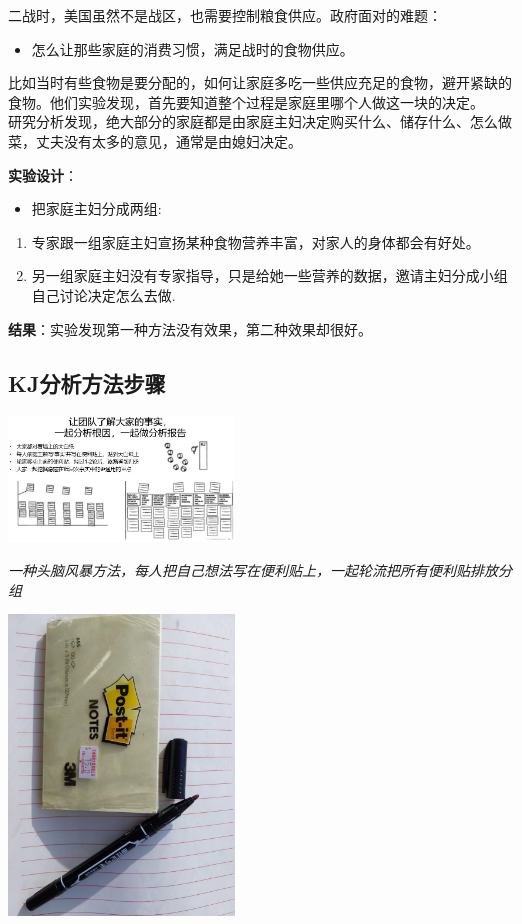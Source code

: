 二战时，美国虽然不是战区，也需要控制粮食供应。政府面对的难题：

\begin{itemize}
\tightlist
\item
  怎么让那些家庭的消费习惯，满足战时的食物供应。
\end{itemize}

比如当时有些食物是要分配的，如何让家庭多吃一些供应充足的食物，避开紧缺的食物。他们实验发现，首先要知道整个过程是家庭里哪个人做这一块的决定。\\
研究分析发现，绝大部分的家庭都是由家庭主妇决定购买什么、储存什么、怎么做菜，丈夫没有太多的意见，通常是由媳妇决定。

\textbf{实验设计}：

\begin{itemize}
\tightlist
\item
  把家庭主妇分成两组:
\end{itemize}

\begin{enumerate}
\tightlist
\item
  专家跟一组家庭主妇宣扬某种食物营养丰富，对家人的身体都会有好处。
\item
  另一组家庭主妇没有专家指导，只是给她一些营养的数据，邀请主妇分成小组自己讨论决定怎么去做.\\
\end{enumerate}

\textbf{结果}：实验发现第一种方法没有效果，第二种效果却很好。

\hypertarget{kjux5206ux6790ux65b9ux6cd5ux6b65ux9aa4}{%
\subsection{KJ分析方法步骤}\label{kjux5206ux6790ux65b9ux6cd5ux6b65ux9aa4}}

\includegraphics[width=6cm]{Kj1Screenshot2023-11-01133052.jpg}

\emph{一种头脑风暴方法，每人把自己想法写在便利贴上，一起轮流把所有便利贴排放分组}

\includegraphics[width=6cm]{微信图片_20231027091622.jpg}

